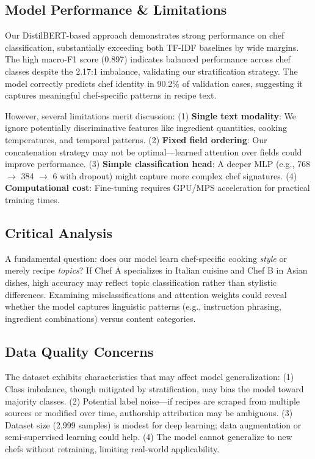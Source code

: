 \documentclass[twocolumn,10pt]{article}
\begin{document}
\subsection{Model Performance \& Limitations}

Our DistilBERT-based approach demonstrates strong performance on chef classification, substantially exceeding both TF-IDF baselines by wide margins. The high macro-F1 score (0.897) indicates balanced performance across chef classes despite the 2.17:1 imbalance, validating our stratification strategy. The model correctly predicts chef identity in 90.2\% of validation cases, suggesting it captures meaningful chef-specific patterns in recipe text.

However, several limitations merit discussion: (1) \textbf{Single text modality}: We ignore potentially discriminative features like ingredient quantities, cooking temperatures, and temporal patterns. (2) \textbf{Fixed field ordering}: Our concatenation strategy may not be optimal—learned attention over fields could improve performance. (3) \textbf{Simple classification head}: A deeper MLP (e.g., 768 $\rightarrow$ 384 $\rightarrow$ 6 with dropout) might capture more complex chef signatures. (4) \textbf{Computational cost}: Fine-tuning requires GPU/MPS acceleration for practical training times.

\subsection{Critical Analysis}

A fundamental question: does our model learn chef-specific cooking \textit{style} or merely recipe \textit{topics}? If Chef A specializes in Italian cuisine and Chef B in Asian dishes, high accuracy may reflect topic classification rather than stylistic differences. Examining misclassifications and attention weights could reveal whether the model captures linguistic patterns (e.g., instruction phrasing, ingredient combinations) versus content categories.

\subsection{Data Quality Concerns}

The dataset exhibits characteristics that may affect model generalization: (1) Class imbalance, though mitigated by stratification, may bias the model toward majority classes. (2) Potential label noise—if recipes are scraped from multiple sources or modified over time, authorship attribution may be ambiguous. (3) Dataset size (2,999 samples) is modest for deep learning; data augmentation or semi-supervised learning could help. (4) The model cannot generalize to new chefs without retraining, limiting real-world applicability. 
\end{document}
